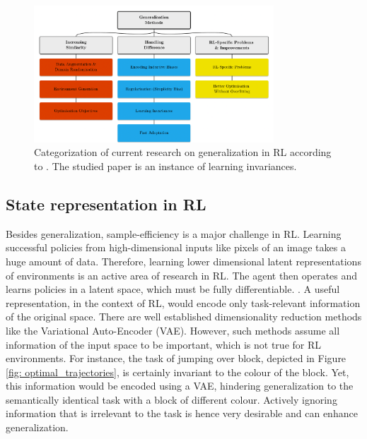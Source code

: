 \documentclass{usiinftr}
\begin{document}
\begin{figure} 
\centering
\includegraphics[width = 0.8\textwidth]{figures/Overview_research.png}
\caption{\label{fig: overview_research} Categorization of current research on generalization in RL according to \cite{kirk2021survey}. The studied paper \cite{agarwal2021contrastive} is an instance of learning invariances. }
\end{figure}

\subsection{State representation in RL} \label{sec: state repr}
Besides generalization, sample-efficiency is a major challenge in RL.
Learning successful policies from high-dimensional inputs like pixels of an image takes a huge amount of data.
Therefore, learning lower dimensional latent representations of environments is an active area of research in RL.
The agent then operates and learns policies in a latent space, which must be fully differentiable. \cite{hadeep}.
A useful representation, in the context of RL, would encode only task-relevant information of the original space.
There are well established dimensionality reduction methods like the Variational Auto-Encoder (VAE).
However, such methods assume all information of the input space to be important, which is not true for RL environments.
For instance, the task of jumping over block, depicted in Figure \ref{fig: optimal_trajectories}, is certainly invariant to the colour of the block.
Yet, this information would be encoded using a VAE, hindering generalization to the semantically identical task with a block of different colour.
Actively ignoring information that is irrelevant to the task is hence very desirable and can enhance generalization.
\cite{hadeep} \cite{kirk2021survey}
\end{document}
